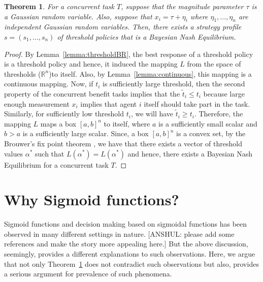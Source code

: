 \documentclass[conference]{ieeeconf}
\newtheorem{theorem}{Theorem}
\def\R{\mathbb{R}}
\begin{document}
\begin{theorem}\label{thrm:mainthrm}
For a concurrent task $T$, suppose that the magnitude parameter $\tau$ is a Gaussian random variable. Also, suppose that $x_i=\tau+\eta_i$ where $\eta_1,\ldots,\eta_n$ are independent Gaussian random variables. Then, there exists a strategy profile $s=(s_1,\ldots,s_n)$ of threshold policies that is a Bayesian Nash Equilibrium.
\end{theorem}
\begin{proof}
By Lemma~\ref{lemma:thresholdBR}, the best response of a threshold policy is a threshold policy and hence, it induced the mapping $L$ from the space of thresholds ($\R^n$)to itself. Also, by Lemma~\ref{lemma:continuous}, this mapping is a continuous mapping. Now, if $t_i$ is sufficiently large threshold, then the second property of the concurrent benefit tasks implies that the $\tilde{t}_i\leq t_i$ because large enough measurement $x_i$ implies that agent $i$ itself should take part in the task. Similarly, for sufficiently low threshold $t_i$, we will have $\tilde{t}_i\geq t_i$. Therefore, the mapping $L$ maps a box $[a,b]^n$ to itself, where $a$ is a sufficiently small scalar and $b>a$ is a sufficiently large scalar. Since, a box $[a,b]^n$ is a convex set, by the Brouwer's fix point theorem \cite{border1990fixed}, we have that there exists a vector of threshold values $\alpha^*$ such that $L(\alpha^*)=L(\alpha^*)$ and hence, there exists a Bayesian Nash Equilibrium for a concurrent task $T$.
\end{proof}



\section{Why Sigmoid functions?}\label{sec:sigfun}
Sigmoid functions and decision making based on sigmoidal functions has been observed in many different settings in nature. [ANSHUL: please add some references and make the story more appealing here.] But the above discussion, seemingly, provides a different explanations to such observations. Here, we argue that not only Theorem~\ref{thrm:mainthrm} does not contradict such observations but also, provides a serious argument for prevalence of such phenomena. 
\end{document}
